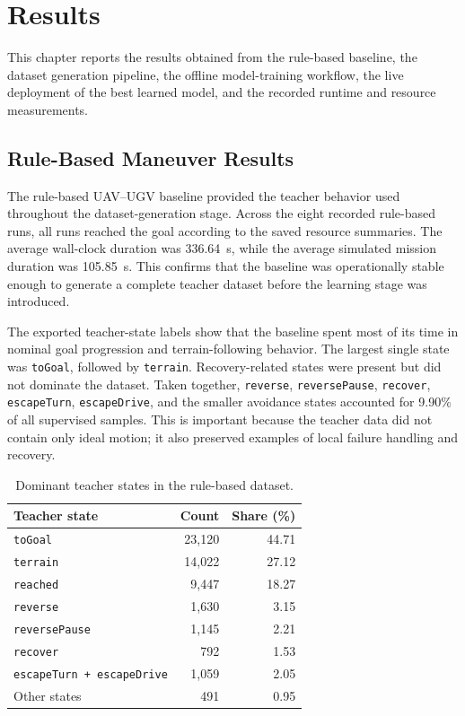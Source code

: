 
\chapter{Results}
\label{ch:results}

This chapter reports the results obtained from the rule-based baseline, the dataset generation pipeline, the offline model-training workflow, the live deployment of the best learned model, and the recorded runtime and resource measurements.

\section{Rule-Based Maneuver Results}

The rule-based UAV--UGV baseline provided the teacher behavior used throughout the dataset-generation stage. Across the eight recorded rule-based runs, all runs reached the goal according to the saved resource summaries. The average wall-clock duration was 336.64~s, while the average simulated mission duration was 105.85~s. This confirms that the baseline was operationally stable enough to generate a complete teacher dataset before the learning stage was introduced.

The exported teacher-state labels show that the baseline spent most of its time in nominal goal progression and terrain-following behavior. The largest single state was \texttt{toGoal}, followed by \texttt{terrain}. Recovery-related states were present but did not dominate the dataset. Taken together, \texttt{reverse}, \texttt{reversePause}, \texttt{recover}, \texttt{escapeTurn}, \texttt{escapeDrive}, and the smaller avoidance states accounted for 9.90\% of all supervised samples. This is important because the teacher data did not contain only ideal motion; it also preserved examples of local failure handling and recovery.

\begin{table}[tbp]
    \caption{Dominant teacher states in the rule-based dataset.}
    \label{tab:rule_state_distribution}
    \centering
    \small
    \setlength{\tabcolsep}{5pt}
    \renewcommand{\arraystretch}{1.12}
    \begin{tabular}{@{}lrr@{}}
        \toprule
        \textbf{Teacher state} & \textbf{Count} & \textbf{Share (\%)} \\
        \midrule
        \texttt{toGoal} & 23,120 & 44.71 \\
        \texttt{terrain} & 14,022 & 27.12 \\
        \texttt{reached} & 9,447 & 18.27 \\
        \texttt{reverse} & 1,630 & 3.15 \\
        \texttt{reversePause} & 1,145 & 2.21 \\
        \texttt{recover} & 792 & 1.53 \\
        \texttt{escapeTurn + escapeDrive} & 1,059 & 2.05 \\
        Other states & 491 & 0.95 \\
        \bottomrule
    \end{tabular}
\end{table}

